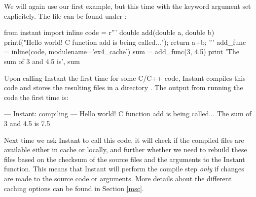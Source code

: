 We will again use our first example, but this time with
the keyword argument  set explicitely. The file can be found
under :
\begin{code}
from instant import inline
code = r'''
double add(double a, double b)
{
  printf("Hello world! C function add is being called...\n"); 
  return a+b;
}'''
add_func = inline(code, modulename='ex4_cache') 
sum = add_func(3, 4.5)
print 'The sum of 3 and 4.5 is', sum
\end{code}
Upon calling Instant the first time for some C/C++ code, Instant compiles this
code and stores the resulting files in a directory . The
output from running the code the first time is:
\begin{code}
--- Instant: compiling ---
Hello world! C function add is being called...
The sum of 3 and 4.5 is 7.5
\end{code}
Next time we ask
Instant to call this code, it will check if the compiled files are available
either in cache or locally, and further whether we need to rebuild these files
based on the checksum of the source files and the arguments to the Instant
function. This means that Instant will perform the compile step \emph{only} if
changes are made to the source code or arguments. More details about the
different caching options can be found in Section \ref{msc}. 

